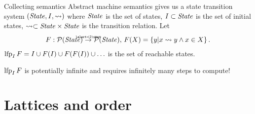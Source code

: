 \documentclass[aspectratio=169,notes]{beamer}
\begin{document}
\begin{frame}{Collecting semantics}
  Abstract machine semantics gives us a state transition system $(\mathit{State}, I, \rightsquigarrow)$ where \pause $\mathit{State}$ is the set of states, \pause $I \subset \mathit{State}$ is the set of initial states, \pause $\rightsquigarrow \subset \mathit{State} \times \mathit{State}$ is the transition relation. \pause Let
  \[ F : \pw(\State) \textoverop{\alert<2>{mon}}{\to} \pw(\State),\, F(X) = \Set{y \vert x \step y \wedge x \in X}. \]\pause
  $\operatorname{lfp}_I F = I \cup F(I) \cup F(F(I)) \cup \ldots $ is the set of reachable states.\pause

  \alert{$\operatorname{lfp}_I F$ is potentially infinite and requires infinitely many steps to compute!}
\end{frame}

\section{Lattices and order}
\end{document}
